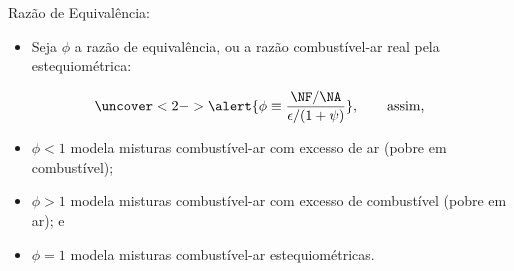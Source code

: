     \begin{frame}{Razão de Equivalência:}\vspace*{-2em}
        \begin{itemize}
            \item<1-> Seja \alert{$\phi$} a razão de equivalência, ou a razão combustível-ar
                \alert{real pela estequiométrica}:
        \end{itemize}
        \vspace*{0.8em}\begin{equation*}
            \uncover<2->{
                \alert{\phi \equiv \frac{\NF/\NA}{\epsilon / (1 + \psi)}},\qquad\mbox{assim,}
            }
        \end{equation*}
        \vspace*{-0.8em}\begin{itemize}
            \item<3-> \alert{$\phi < 1$} modela misturas combustível-ar com
                \alert{excesso de ar} (pobre em combustível);
                \\[\bigskipamount]
            \item<4-> \alert{$\phi > 1$} modela misturas combustível-ar com
                \alert{excesso de combustível} (pobre em ar); e
                \\[\bigskipamount]
            \item<5-> \alert{$\phi = 1$} modela misturas combustível-ar
                \alert{estequiométricas}.
        \end{itemize}
    \end{frame}




